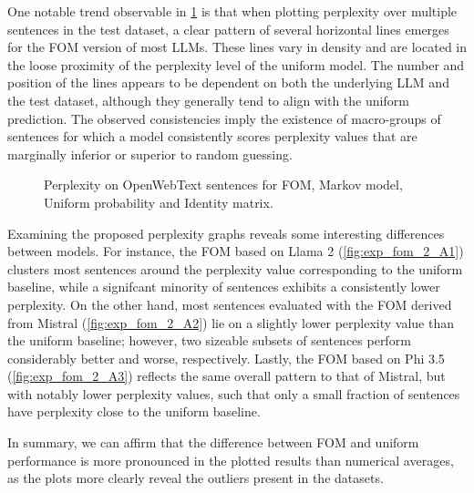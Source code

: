 One notable trend observable in \cref{fig:exp_fom_2_A} is that when plotting perplexity over multiple sentences in the test dataset, a clear pattern of several horizontal lines emerges for the FOM version of most LLMs.
These lines vary in density and are located in the loose proximity of the perplexity level of the uniform model.
The number and position of the lines appears to be dependent on both the underlying LLM and the test dataset, although they generally tend to align with the uniform prediction.
The observed consistencies imply the existence of macro-groups of sentences for which a model consistently scores perplexity values that are marginally inferior or superior to random guessing.

\begin{figure}[t!]
    \centering
    \quad
    \caption{Perplexity on OpenWebText sentences for FOM, Markov model, Uniform probability and Identity matrix.}
    \label{fig:exp_fom_2_A}
\end{figure}

Examining the proposed perplexity graphs reveals some interesting differences between models.
For instance, the FOM based on Llama 2 (\cref{fig:exp_fom_2_A1}) clusters most sentences around the perplexity value corresponding to the uniform baseline, while a signifcant minority of sentences exhibits a consistently lower perplexity.
On the other hand, most sentences evaluated with the FOM derived from Mistral (\cref{fig:exp_fom_2_A2}) lie on a slightly lower perplexity value than the uniform baseline; however, two sizeable subsets of sentences perform considerably better and worse, respectively.
Lastly, the FOM based on Phi 3.5 (\cref{fig:exp_fom_2_A3}) reflects the same overall pattern to that of Mistral, but with notably lower perplexity values, such that only a small fraction of sentences have perplexity close to the uniform baseline.

In summary, we can affirm that the difference between FOM and uniform performance is more pronounced in the plotted results than numerical averages, as the plots more clearly reveal the outliers present in the datasets.

